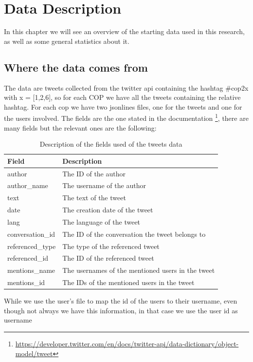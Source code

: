 \chapter{Data Description}%
In this chapter we will see an overview of the starting data used in this research, as well as some general statistics about it.

\section{Where the data comes from}
The data are tweets collected from the twitter api containing the hashtag \#cop2x with x = [1,2,6], so for each COP we have all the tweets containing the relative hashtag.
For each cop we have two jsonlines files, one for the tweets and one for the users involved. The fields are the one stated in the documentation \footnote{ \href{https://developer.twitter.com/en/docs/twitter-api/data-dictionary/object-model/tweet}{https://developer.twitter.com/en/docs/twitter-api/data-dictionary/object-model/tweet}}, there are many fields but the relevant ones are the following: 

\begin{table}[H]
\centering
\begin{tabular}{|l|l|}
\hline
\textbf{Field} & \textbf{Description} \\ \hline
author & The ID of the author \\ \hline
author\_name & The username of the author \\ \hline
text & The text of the tweet \\ \hline
date & The creation date of the tweet \\ \hline
lang & The language of the tweet \\ \hline
conversation\_id & The ID of the conversation the tweet belongs to \\ \hline
referenced\_type & The type of the referenced tweet \\ \hline
referenced\_id & The ID of the referenced tweet \\ \hline
mentions\_name & The usernames of the mentioned users in the tweet \\ \hline
mentions\_id & The IDs of the mentioned users in the tweet \\ \hline

\end{tabular}
\caption{Description of the fields used of the tweets data}
\label{tab:my_label}
\end{table}
While we use the user's file to map the id of the users to their username, even though not always we have this information, in that case we use the user id as username

